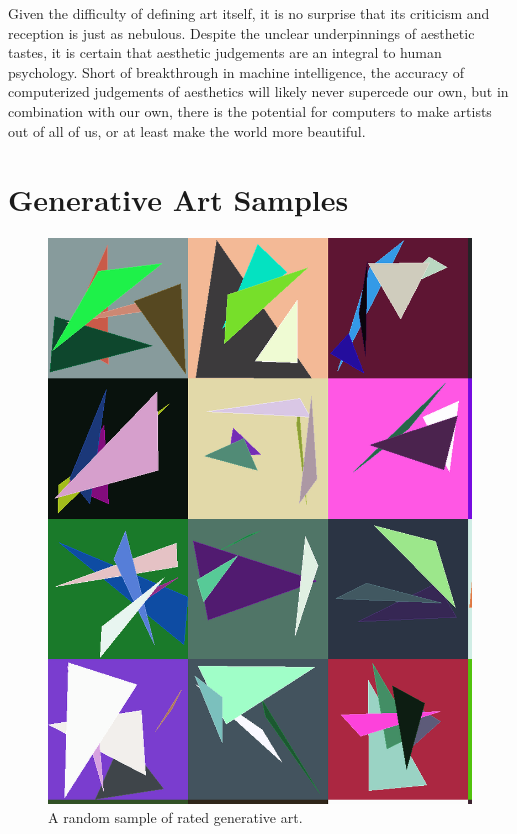 \documentclass[midd]{thesis}
\begin{document}
Given the difficulty of defining art itself, it is no surprise that its criticism and reception is just as nebulous. Despite the unclear underpinnings of aesthetic tastes, it is certain that aesthetic judgements are an integral to human psychology. Short of breakthrough in machine intelligence, the accuracy of computerized judgements of aesthetics will likely never supercede our own, but in combination with our own, there is the potential for computers to make artists out of all of us, or at least make the world more beautiful.













\appendix
\chapter{Generative Art Samples}

\begin{figure}[t]
\centering
\includegraphics[width=\textwidth]{visualizations/randomgallery-shortened.png}
\caption{A random sample of rated generative art.}
\label{fig:random-generative-art}
\end{figure}
\end{document}
